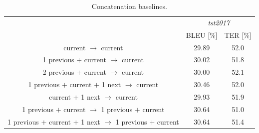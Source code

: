 \documentclass[11pt, a4paper, landscape]{article}
\begin{document}
\NewPage
{}
\vfill
\begin{table}
  \small
  \bf
  \caption{Concatenation baselines.}
  \begin{center}
    \begin{tabular}{c||cc}
      & \multicolumn{2}{c}{\textit{tst2017}} \\
      & BLEU [$\%$] & TER [$\%$] \\
      \toprule
      \toprule
      \phantom{1 previous $+$ }current\phantom{ $+$ 1 next} $\to$ \phantom{1 previous $+$ }current & 29.89 & 52.0 \\
      \midrule
      1 previous $+$ current\phantom{ $+$ 1 next} $\to$ \phantom{1 previous $+$ }current & 30.02 & 51.8 \\
      2 previous $+$ current\phantom{ $+$ 1 next} $\to$ \phantom{1 previous $+$ }current & 30.00 & 52.1 \\
      1 previous $+$ current $+$ 1 next $\to$ \phantom{1 previous $+$ }current & 30.46 & 52.0 \\
      \phantom{1 previous $+$ }current $+$ 1 next $\to$ \phantom{1 previous $+$ }current & 29.93 & 51.9 \\
      \midrule
      1 previous $+$ current\phantom{ $+$ 1 next} $\to$ 1 previous $+$ current & \alert{30.64} & \alert{51.0} \\
      1 previous $+$ current $+$ 1 next $\to$ 1 previous $+$ current & \alert{30.64} & 51.4 \\
    \end{tabular}
  \end{center}
\end{table}
\vfill
\end{document}
